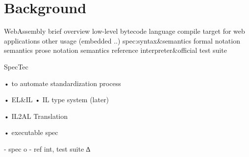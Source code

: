 
\chapter{Background}
\label{ch:background}
\noindent

WebAssembly
  brief overview
    low-level bytecode language
    compile target for web applications
    other usage (embedded ..)
  spec:syntax\&semantics
    formal notation semantics
    prose notation semantics
  reference interpreter\&official test suite

SpecTec

• to automate standardization process

• EL\&IL
  • IL type system (later)

• IL2AL Translation

• executable spec

  - spec o
  - ref int, test suite ∆
